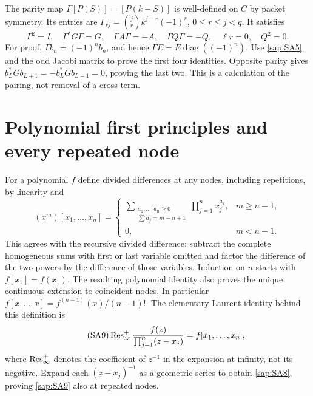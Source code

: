 The parity map $\Gamma[P(S)]=[P(k-S)]$ is well-defined
on $C$ by packet symmetry. Its entries are
$\Gamma_{rj}=\binom jr k^{j-r}(-1)^r$, $0\leq r\leq j<q$.
It satisfies
\begin{equation}\tag{SA7}\label{sap:SA7}
\Gamma^2=I,\quad \Gamma^*G\Gamma=G,\quad
\Gamma A\Gamma=-A,\quad \Gamma Q\Gamma=-Q,\quad
\ell r=0,\quad Q^2=0.
\end{equation}
For proof, $\Gamma b_n=(-1)^nb_n$, and hence
$\Gamma E=E\operatorname{diag}((-1)^n)$.
Use \eqref{sap:SA5} and the odd Jacobi matrix to prove the
first four identities. Opposite parity gives
$b_L^*Gb_{L+1}=-b_L^*Gb_{L+1}=0$, proving the last two.
This is a calculation of the pairing, not removal of a
cross term.

\section{Polynomial first principles and every repeated node}

For a polynomial $f$ define divided differences at any
nodes, including repetitions, by linearity and
\begin{equation}\tag{SA8}\label{sap:SA8}
(x^m)[x_1,\ldots,x_n]=
\begin{cases}
\displaystyle\sum_{\substack{a_1,\ldots,a_n\geq0\\
 \sum a_j=m-n+1}}\prod_{j=1}^n x_j^{a_j},&m\geq n-1,\\
0,&m<n-1.
\end{cases}
\end{equation}
This agrees with the recursive divided difference:
subtract the complete homogeneous sums with first or last
variable omitted and factor the difference of the two
powers by the difference of those variables. Induction
on $n$ starts with $f[x_1]=f(x_1)$.
The resulting polynomial identity also proves the unique
continuous extension to coincident nodes. In particular
$f[x,\ldots,x]=f^{(n-1)}(x)/(n-1)!$.
The elementary Laurent identity behind this definition is
\begin{equation}\tag{SA9}\label{sap:SA9}
\operatorname{Res}_\infty^+\frac{f(z)}
 {\prod_{j=1}^n(z-x_j)}
=f[x_1,\ldots,x_n],
\end{equation}
where $\operatorname{Res}_\infty^+$ denotes the coefficient of $z^{-1}$
in the expansion at infinity, not its negative.
Expand each $(z-x_j)^{-1}$ as a geometric series to obtain
\eqref{sap:SA8}, proving \eqref{sap:SA9} also at repeated nodes.

